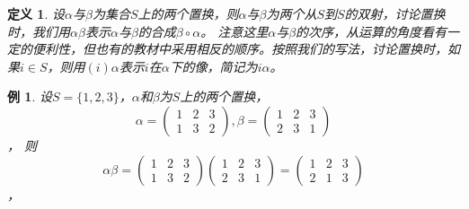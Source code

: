 \documentclass{book}[oneside]
\newtheorem{Def}{定义}[chapter]
\newtheorem*{Example}{例}
\begin{document}
\begin{CJK*}{UTF8}{gbsn}
  \begin{Def}
    设$\alpha$与$\beta$为集合$S$上的两个置换，则$\alpha$与$\beta$为两个从$S$到$S$的双射，讨论置换时，我们用$\alpha\beta$表示$\alpha$与$\beta$的合成$\beta \circ \alpha$。
    注意这里$\alpha$与$\beta$的次序，从运算的角度看有一定的便利性，但也有的教材中采用相反的顺序。按照我们的写法，讨论置换时，如果$i \in S$，则用$(i)\alpha$表示$i$在$\alpha$下的像，简记为$i\alpha$。
  \end{Def}
  \begin{Example}
    设$S=\{1,2,3\}$，$\alpha$和$\beta$为$S$上的两个置换，
    \[\alpha=\begin{pmatrix}1&2&3\\1&3&2\end{pmatrix},\beta=\begin{pmatrix}1&2&3\\2&3&1\end{pmatrix}\]，
    则
    \[\alpha\beta=\begin{pmatrix}1&2&3\\1&3&2\end{pmatrix}\begin{pmatrix}1&2&3\\2&3&1\end{pmatrix}=\begin{pmatrix}1&2&3\\2&1&3\end{pmatrix}\]，    
  \end{Example}


\end{CJK*}
\end{document}
